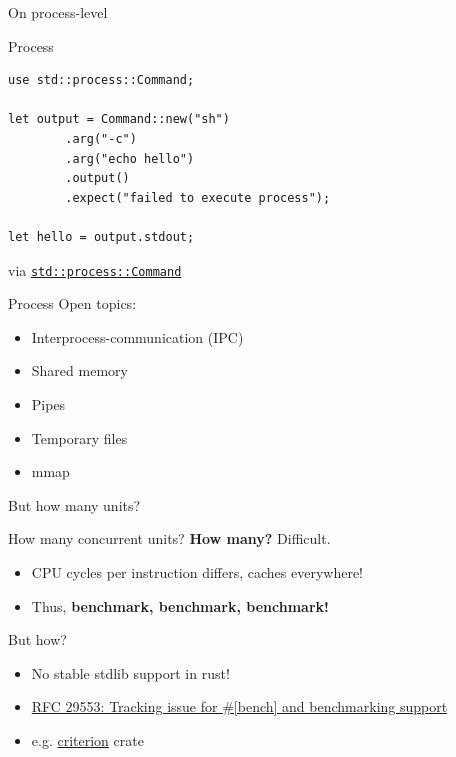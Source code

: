 \documentclass{beamer}
\begin{document}
\begin{frame}[standout]
  On process-level
\end{frame}

\begin{frame}[fragile]{Process}
  \begin{verbatim}
use std::process::Command;

let output = Command::new("sh")
        .arg("-c")
        .arg("echo hello")
        .output()
        .expect("failed to execute process");

let hello = output.stdout;
  \end{verbatim}

  via \href{https://doc.rust-lang.org/std/process/struct.Command.html}{\texttt{std::process::Command}}
\end{frame}

\begin{frame}[fragile]{Process}
  Open topics:

  \begin{itemize}
    \item Interprocess-communication (IPC)
    \item Shared memory
    \item Pipes
    \item Temporary files
    \item mmap
  \end{itemize}
\end{frame}

\begin{frame}[standout]
  But how many units?
\end{frame}

\begin{frame}[fragile]{How many concurrent units?}
  \textbf{How many?} Difficult.
  \begin{itemize}
    \item CPU cycles per instruction differs, caches everywhere!
    \item Thus, \textbf{benchmark, benchmark, benchmark!}
  \end{itemize}
  But how?
  \begin{itemize}
    \item No stable stdlib support in rust!
    \item \href{https://github.com/rust-lang/rust/issues/29553}{RFC 29553: Tracking issue for #[bench] and benchmarking support}
    \item e.g. \href{https://crates.io/crates/criterion}{criterion} crate
  \end{itemize}
\end{frame}
\end{document}
